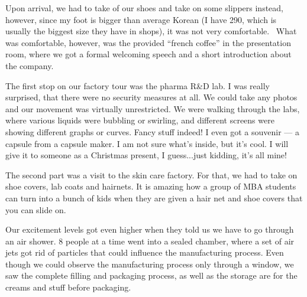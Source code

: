 \begin{post}
\begin{content}
Upon arrival, we had to take of our shoes and take on some slippers instead, however, since my foot is bigger than average Korean (I have 290, which is usually the biggest size they have in shops), it was not very comfortable.  What was comfortable, however, was the provided ``french coffee'' in the presentation room, where we got a formal welcoming speech and a short introduction about the company.


The first stop on our factory tour was the pharma R\&D lab. I was really surprised, that there were no security measures at all. We could take any photos and our movement was virtually unrestricted. We were walking through the labs, where various liquids were bubbling or swirling, and different screens were showing different graphs or curves. Fancy stuff indeed! I even got a souvenir — a capsule from a capsule maker. I am not sure what's inside, but it's cool. I will give it to someone as a Christmas present, I guess...just kidding, it's all mine!


The second part was a visit to the skin care factory. For that, we had to take on shoe covers, lab coats and hairnets. It is amazing how a group of MBA students can turn into a bunch of kids when they are given a hair net and shoe covers that you can slide on.


Our excitement levels got even higher when they told us we have to go through an air shower. 8 people at a time went into a sealed chamber, where a set of air jets got rid of particles that could influence the manufacturing process. Even though we could observe the manufacturing process only through a window, we saw the complete filling and packaging process, as well as the storage are for the creams and stuff before packaging.


\end{content}
\end{post}
